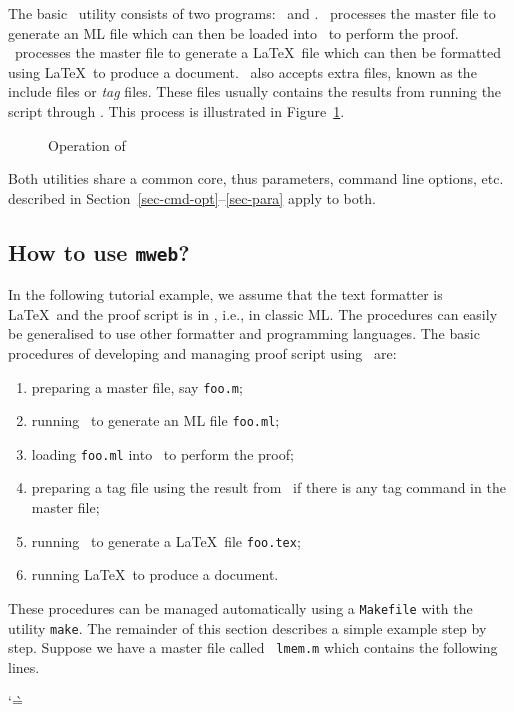 The basic \mweb\ utility consists of two programs: \tangle\ and \weave.
\tangle\ processes the master file to generate an ML file which can
then be loaded into \HOL\ to perform the proof. \weave\ processes the
master file to generate a \LaTeX\ file which can then be formatted
using \LaTeX\ to produce a document. \weave\ also accepts extra files,
known as the include files or {\it tag\/} files. These files usually
contains the results from running the script through \HOL. This
process is illustrated in Figure~\ref{fig-web-proc}.
\begin{figure}
\begin{center}

\end{center}
\caption{Operation of \mweb\label{fig-web-proc}}
\end{figure}
Both utilities share a common core, thus parameters, command line
options, etc. described in Section~\ref{sec-cmd-opt}--\ref{sec-para}
apply to both. 

\subsection{How to use {\tt mweb}?}

In the following tutorial example, we assume that the text formatter
is \LaTeX\ and the proof script is in , i.e., in classic ML. The
procedures can easily be generalised to use other formatter and
programming languages.
The basic procedures of developing and managing proof script using
\mweb\ are:
\begin{enumerate}
\item preparing a master file, say {\tt foo.m};
\item running \tangle\ to generate an ML file {\tt foo.ml};
\item loading {\tt foo.ml} into \HOL\ to perform the proof;
\item preparing a tag file using the result from \HOL\ if there is any
tag command in the master file;
\item running \weave\ to generate a \LaTeX\ file {\tt foo.tex};
\item running \LaTeX\ to produce a document.
\end{enumerate}
These procedures can be managed automatically using a {\tt Makefile}
with the utility {\tt make}. The remainder of this section describes a
simple example step by step. Suppose we have a master file called {\tt
lmem.m} which contains the following lines.

\begingroup
 \makeatletter
 \catcode`\`=\active
 \def\verbatim@font{\footnotesize\tt \catcode96\active
   \def`{\leavevmode\kern\z@\char96 }}
 \makeatother

